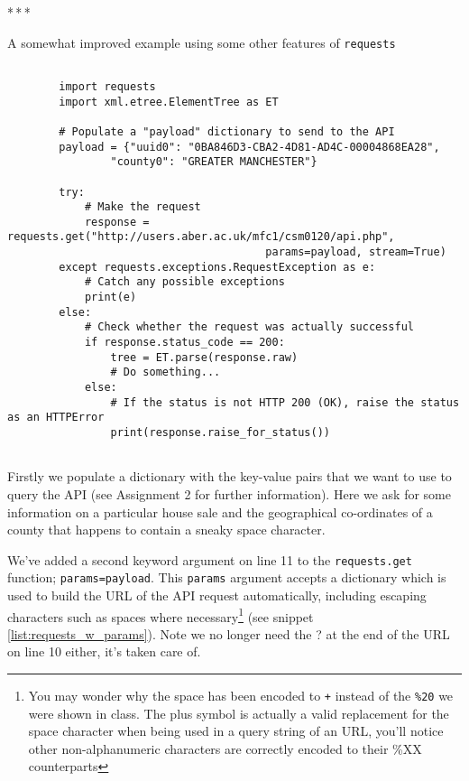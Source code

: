 \documentclass[a4paper]{article}
\newcommand{\asterism}{\bigskip\par\centerline{*\,*\,*}\medskip\par}%
\begin{document}
\asterism
\pagebreak

\begin{listing}[H]
    \caption[]{A somewhat improved example using some other features of \texttt{requests}}
    \label{list:requests_w_payload}
    \begin{verbatim}

        import requests
        import xml.etree.ElementTree as ET

        # Populate a "payload" dictionary to send to the API
        payload = {"uuid0": "0BA846D3-CBA2-4D81-AD4C-00004868EA28",
                "county0": "GREATER MANCHESTER"}

        try:
            # Make the request
            response = requests.get("http://users.aber.ac.uk/mfc1/csm0120/api.php",
                                        params=payload, stream=True)
        except requests.exceptions.RequestException as e:
            # Catch any possible exceptions
            print(e)
        else:
            # Check whether the request was actually successful
            if response.status_code == 200:
                tree = ET.parse(response.raw)
                # Do something...
            else:
                # If the status is not HTTP 200 (OK), raise the status as an HTTPError
                print(response.raise_for_status())


    \end{verbatim}
\end{listing}

Firstly we populate a dictionary with the key-value pairs that we want to use to
query the API (see Assignment 2 for further information). Here we ask for some
information on a particular house sale and the geographical co-ordinates of a
county that happens to contain a sneaky space character.

We've added a second keyword argument on line 11 to the \texttt{requests.get} function;
\texttt{params=payload}. This \texttt{params} argument accepts a dictionary which
is used to build the URL of the API request automatically, including escaping
characters such as spaces where necessary\footnote{You may wonder why the space has
been encoded to \texttt{+} instead of the \texttt{\%20} we were shown in class. The plus
symbol is actually a valid replacement for the space character when being used in
a query string of an URL, you'll notice other non-alphanumeric characters are correctly
encoded to their \%XX counterparts} (see snippet \ref{list:requests_w_params}).
Note we no longer need the ? at the end of the URL on line 10 either, it's taken care of.
\end{document}
